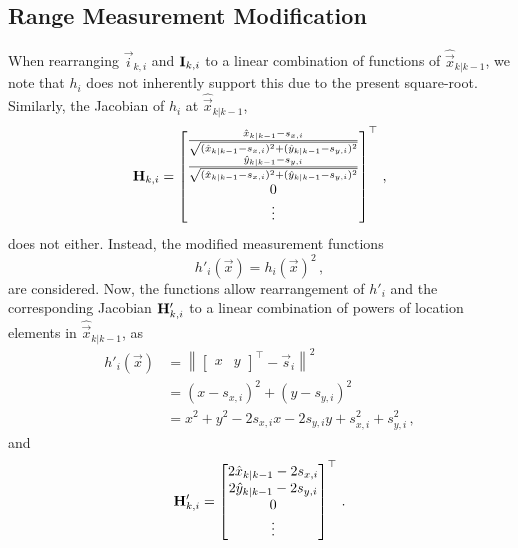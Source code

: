 \subsection{Range Measurement Modification}\label{subsec:nonlin_fusion:measurement_modification}
When rearranging $\vec{i}_{k, i}$ and ${{\mathbf{I}}}_{k, i}$ to a linear combination of functions of $\hat{\vec{x}}_{k|k-1}$, we note that $h_i$ does not inherently support this due to the present square-root. Similarly, the Jacobian of $h_i$ at $\hat{\vec{x}}_{k|k-1}$,
\begin{equation}
    {\ensuremath{{\mathbf{H}}}}_{k,i} = 
    \begin{bmatrix}
        \frac{\hat{x}_{k|k-1} - s_{x,i}}{\sqrt{(\hat{x}_{k|k-1} - s_{x,i})^2 + (\hat{y}_{k|k-1} - s_{y,i})^2}} \\
        \frac{\hat{y}_{k|k-1} - s_{y,i}}{\sqrt{(\hat{x}_{k|k-1} - s_{x,i})^2 + (\hat{y}_{k|k-1} - s_{y,i})^2}} \\
        0 \\
        \vdots
    \end{bmatrix}^\top\,,
\end{equation}
does not either. Instead, the modified measurement functions
\begin{equation}\label{eq:nonlin_fusion:modified_measurement_func}
    h'_i(\vec{x}) = h_i(\vec{x})^2\,,
\end{equation}
are considered. Now, the functions allow rearrangement of $h'_i$ and the corresponding Jacobian ${{\mathbf{H}}}'_{k,i}$ to a linear combination of powers of location elements in $\hat{\vec{x}}_{k|k-1}$, as
\begin{equation}
    \begin{split}
        h'_i(\vec{x}) &= \left\lVert
        \begin{bmatrix}
            x & y
        \end{bmatrix}^\top - \vec{s}_i\right\rVert^2 \\
        &= (x - s_{x,i})^2 + (y - s_{y,i})^2 \\
        &= x^2 + y^2 -2s_{x,i}x -2s_{y,i}y +s_{x,i}^2 +s_{y,i}^2\,,
    \end{split}
\end{equation}
and
\begin{equation}\label{eq:nonlin_fusion:modified_jacobian}
    {\ensuremath{{\mathbf{H}}}}'_{k,i} = 
    \begin{bmatrix}
        2\hat{x}_{k|k-1} - 2s_{x,i} \\
        2\hat{y}_{k|k-1} - 2s_{y,i} \\
        0 \\
        \vdots
    \end{bmatrix}^\top\,.
\end{equation}
